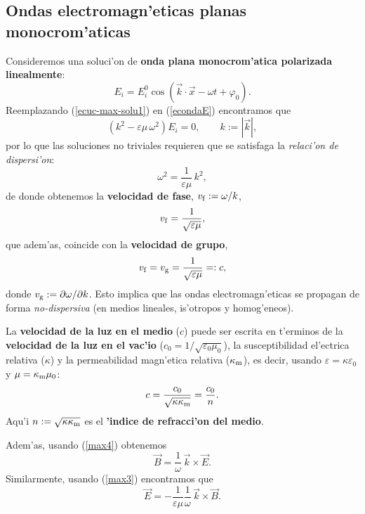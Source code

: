 \subsection{Ondas electromagn'eticas planas monocrom'aticas}
Consideremos una soluci'on de \textbf{onda plana monocrom'atica polarizada linealmente}:
\begin{equation}
E_i=E_i^0 \cos\left(\vec{k}\cdot\vec{x}-\omega t+\varphi_0\right)
.\label{ecuc-max-solu1}%
\end{equation}
Reemplazando (\ref{ecuc-max-solu1}) en (\ref{econdaE}) encontramos que%
\begin{equation}
\left(k^2-\varepsilon\mu\,\omega^2\right)  E_i=0, \qquad k:=|\vec{k}|,
\end{equation}
por lo que las soluciones no triviales requieren que se satisfaga la
\textit{relaci'on de dispersi'on}:
\begin{equation}
\omega^2=\frac{1}{\varepsilon\mu}\,k^2, \label{rdoem}
\end{equation}
de donde obtenemos la \textbf{velocidad de fase},
$v_{\rm f}:=\omega/k$,
\begin{equation}
v_{\rm f}=\frac{1}{\sqrt{\varepsilon\mu}},
\end{equation}
que adem'as, coincide con la \textbf{velocidad de grupo}, 
\begin{equation}
v_{\rm f}=v_{\rm g}=\frac{1}{\sqrt{\varepsilon\mu}}=:c,
\end{equation}
donde $v_{\rm g}:=\partial\omega/\partial k$. Esto implica que las ondas electromagn'eticas se propagan de forma \textit{no-dispersiva} (en medios lineales, is'otropos y homog'eneos). 

La \textbf{velocidad de la luz en el medio} ($c$) puede ser escrita en t'erminos de la \textbf{velocidad de la luz en el vac'io} ($c_0=1/\sqrt{\varepsilon_0\mu_0}$), la susceptibilidad el'ectrica relativa ($\kappa$) y la permeabilidad magn'etica relativa ($\kappa_{\rm m}$), es decir, usando $\varepsilon=\kappa\varepsilon_0$ y $\mu=\kappa_{\rm m}\mu_0$:
\begin{equation}
c=\frac{c_0}{\sqrt{\kappa\kappa_{\rm m}}}=\frac{c_0}{n}.
\end{equation}
Aqu'i $n:=\sqrt{\kappa\kappa_{\rm m}}$ es el \textbf{'indice de refracci'on del medio}.

Adem'as, usando (\ref{max4}) obtenemos
\begin{equation}\label{BkE}
 \vec{B}=\frac{1}{\omega}\,\vec{k}\times\vec{E}.
\end{equation}
Similarmente, usando (\ref{max3}) encontramos que
\begin{equation}
 \vec{E}=-\frac{1}{\varepsilon\mu}\frac{1}{\omega}\,\vec{k}\times\vec{B}.
\end{equation}

